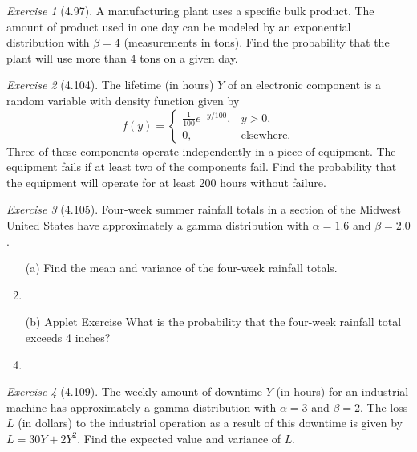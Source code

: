 \documentclass[12pt]{amsart}
\makeatletter
\theoremstyle{remark}
\newtheorem*{exercise}{Exercise}%
\renewenvironment{proof}[1][\proofname]{\par\doublespacing
  \pushQED{\qed}%
  \normalfont \topsep6\p@\@plus6\p@\relax
  \list{}{%
    \settowidth{\leftmargin}{\itshape\proofname:\hskip\labelsep}%
    \setlength{\labelwidth}{0pt}%
    \setlength{\itemindent}{-\leftmargin}%
  }%
  \item[\hskip\labelsep\itshape#1\@addpunct{:}]\ignorespaces
}{%
  \popQED\endlist\@endpefalse
  \singlespacing
}
\theoremstyle{mycomment}
\makeatother
\begin{document}
\begin{exercise}[4.97]
A manufacturing plant uses a specific bulk product. The amount of product used in one day can be modeled by an exponential distribution with $\beta = 4$ (measurements in tons). Find the probability that the plant will use more than 4 tons on a given day.

\begin{proof}[Solution]
 
\end{proof}
\end{exercise}

\begin{exercise}[4.104]
The lifetime (in hours) $Y$ of an electronic component is a random variable with density function given by
$$f(y) = \begin{cases}
\frac{1}{100}e^{-y/100}, & y > 0, \\
0, & \text{elsewhere}.
\end{cases}$$
Three of these components operate independently in a piece of equipment. The equipment fails if at least two of the components fail. Find the probability that the equipment will operate for at least 200 hours without failure.

\begin{proof}[Solution]
 
\end{proof}
\end{exercise}

\begin{exercise}[4.105]
Four-week summer rainfall totals in a section of the Midwest United States have approximately a gamma distribution with $\alpha = 1.6$ and $\beta = 2.0$.

\begin{enumerate}
    \item[(a)] Find the mean and variance of the four-week rainfall totals.
\begin{proof}[Solution]
 
\end{proof}
    \item[(b)] Applet Exercise What is the probability that the four-week rainfall total exceeds 4 inches?
\begin{proof}[Solution]
 
\end{proof}
\end{enumerate}
\end{exercise}

\begin{exercise}[4.109]
The weekly amount of downtime $Y$ (in hours) for an industrial machine has approximately a gamma distribution with $\alpha = 3$ and $\beta = 2$. The loss $L$ (in dollars) to the industrial operation as a result of this downtime is given by $L = 30Y + 2Y^2$. Find the expected value and variance of $L$.

\begin{proof}[Solution]
 
\end{proof}
\end{exercise}
\end{document}
